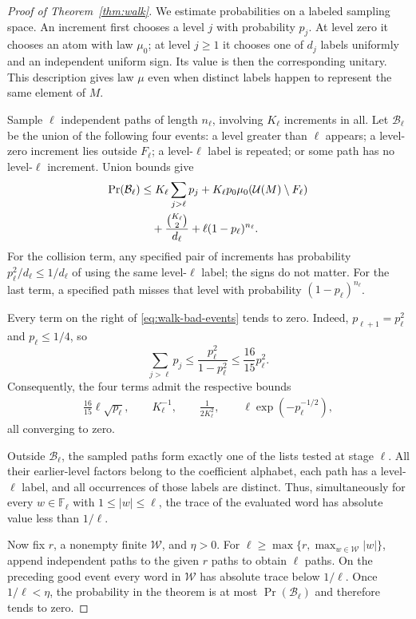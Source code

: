 \begin{proof}[Proof of Theorem~\ref{thm:walk}]
We estimate probabilities on a labeled sampling space.  An increment
first chooses a level $j$ with probability $p_j$.  At level zero it
chooses an atom with law $\mu_0$; at level $j\geq1$ it chooses one of
$d_j$ labels uniformly and an independent uniform sign.  Its value is
then the corresponding unitary.  This description gives law $\mu$ even
when distinct labels happen to represent the same element of $M$.

Sample $\ell$ independent paths of length $n_\ell$, involving
$K_\ell$ increments in all.  Let $\mathcal B_\ell$ be the union of
the following four events: a level greater than $\ell$ appears; a
level-zero increment lies outside $F_\ell$; a level-$\ell$ label is
repeated; or some path has no level-$\ell$ increment.  Union bounds give
\begin{align}
 \Pr(\mathcal B_\ell)
 &\leq K_\ell\sum_{j>\ell}p_j
       +K_\ell p_0\mu_0(\mathcal U(M)\setminus F_\ell)\notag\\
 &\quad+\frac{\binom{K_\ell}{2}}{d_\ell}
       +\ell(1-p_\ell)^{n_\ell}.
 \label{eq:walk-bad-events}
\end{align}
For the collision term, any specified pair of increments has
probability $p_\ell^2/d_\ell\leq1/d_\ell$ of using the same
level-$\ell$ label; the signs do not matter.  For the last term, a
specified path misses that level with probability
$(1-p_\ell)^{n_\ell}$.

Every term on the right of \eqref{eq:walk-bad-events} tends to zero.
Indeed, $p_{\ell+1}=p_\ell^2$ and $p_\ell\leq1/4$, so
\[
 \sum_{j>\ell}p_j
 \leq\frac{p_\ell^2}{1-p_\ell^2}
 \leq\frac{16}{15}p_\ell^2.
\]
Consequently, the four terms admit the respective bounds
\begin{align*}
 \frac{16}{15}\ell\sqrt{p_\ell},\qquad
 K_\ell^{-1},\qquad
 \frac{1}{2K_\ell^2},\qquad
 \ell\exp(-p_\ell^{-1/2}),
\end{align*}
all converging to zero.

Outside $\mathcal B_\ell$, the sampled paths form exactly one of the
lists tested at stage $\ell$.  All their earlier-level factors belong
to the coefficient alphabet, each path has a level-$\ell$ label, and
all occurrences of those labels are distinct.  Thus, simultaneously
for every $w\in\mathbb F_\ell$ with $1\leq|w|\leq\ell$, the trace
of the evaluated word has absolute value less than $1/\ell$.

Now fix $r$, a nonempty finite $\mathcal W$, and $\eta>0$.  For
$\ell\geq\max\{r,\max_{w\in\mathcal W}|w|\}$, append independent
paths to the given $r$ paths to obtain $\ell$ paths.  On the preceding
good event every word in $\mathcal W$ has absolute trace below
$1/\ell$.  Once $1/\ell<\eta$, the probability in the theorem is at
most $\Pr(\mathcal B_\ell)$ and therefore tends to zero.


\end{proof}

